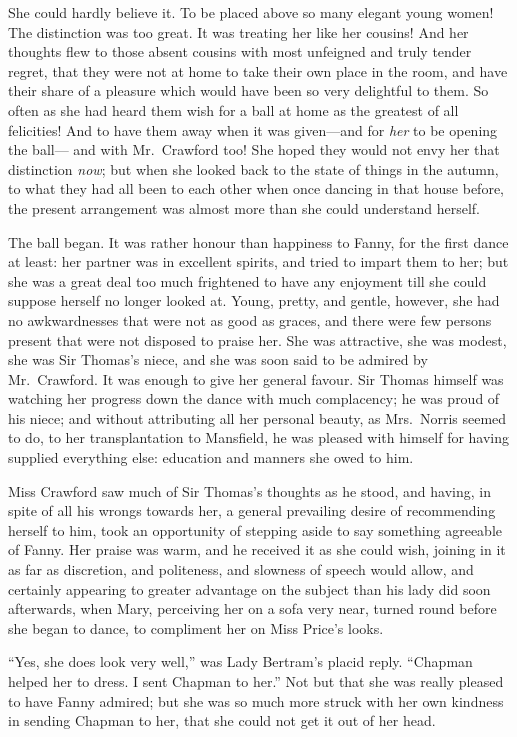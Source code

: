 She could hardly believe it.  To be placed above so many
elegant young women!  The distinction was too great.
It was treating her like her cousins!  And her thoughts
flew to those absent cousins with most unfeigned and truly
tender regret, that they were not at home to take their
own place in the room, and have their share of a pleasure
which would have been so very delightful to them.
So often as she had heard them wish for a ball at home
as the greatest of all felicities!  And to have them away
when it was given---and for \emph{her} to be opening the ball---%
and with Mr.\ Crawford too!  She hoped they would not envy
her that distinction \emph{now}; but when she looked back
to the state of things in the autumn, to what they had all
been to each other when once dancing in that house before,
the present arrangement was almost more than she could
understand herself.

The ball began.  It was rather honour than happiness
to Fanny, for the first dance at least:  her partner was
in excellent spirits, and tried to impart them to her;
but she was a great deal too much frightened to have
any enjoyment till she could suppose herself no longer
looked at.  Young, pretty, and gentle, however, she had
no awkwardnesses that were not as good as graces,
and there were few persons present that were not disposed
to praise her.  She was attractive, she was modest,
she was Sir Thomas's niece, and she was soon said
to be admired by Mr.\ Crawford.  It was enough to give
her general favour.  Sir Thomas himself was watching
her progress down the dance with much complacency;
he was proud of his niece; and without attributing
all her personal beauty, as Mrs.\ Norris seemed to do,
to her transplantation to Mansfield, he was pleased
with himself for having supplied everything else:
education and manners she owed to him.

Miss Crawford saw much of Sir Thomas's thoughts as he stood,
and having, in spite of all his wrongs towards her,
a general prevailing desire of recommending herself to him,
took an opportunity of stepping aside to say something
agreeable of Fanny.  Her praise was warm, and he received
it as she could wish, joining in it as far as discretion,
and politeness, and slowness of speech would allow,
and certainly appearing to greater advantage on the subject
than his lady did soon afterwards, when Mary, perceiving her
on a sofa very near, turned round before she began to dance,
to compliment her on Miss Price's looks.

``Yes, she does look very well,'' was Lady Bertram's placid reply.
``Chapman helped her to dress.  I sent Chapman to her.''
Not but that she was really pleased to have Fanny admired;
but she was so much more struck with her own kindness
in sending Chapman to her, that she could not get it out
of her head.

